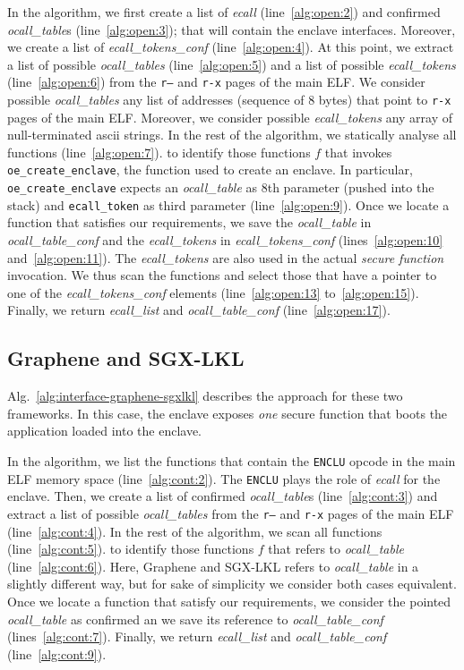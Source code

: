 In the algorithm, we first create a list of \emph{ecall}
(line~\ref{alg:open:2}) and confirmed \emph{ocall\_table}s
(line~\ref{alg:open:3}); that will contain the enclave interfaces.
Moreover, we create a list of \emph{ecall\_tokens\_conf}
(line~\ref{alg:open:4}).
At this point, we extract a list of possible \emph{ocall\_tables}
(line~\ref{alg:open:5}) and a list of possible \emph{ecall\_tokens}
(line~\ref{alg:open:6}) from the \texttt{r--} and \texttt{r-x} pages of the
main ELF.
We consider possible \emph{ocall\_tables} any list of addresses (\ie sequence
of $8$ bytes) that point to \texttt{r-x} pages of the main ELF.
Moreover, we consider possible \emph{ecall\_tokens} any array of
null-terminated ascii strings.
In the rest of the algorithm, we statically analyse all functions
(line~\ref{alg:open:7}).
to identify those functions $f$ that invokes
\texttt{oe\_create\_enclave}, the function used to create an enclave.
In particular, \texttt{oe\_create\_enclave} expects an \emph{ocall\_table} as
8th parameter (pushed into the stack) and \texttt{ecall\_token} as third
parameter (line~\ref{alg:open:9}).
Once we locate a function that satisfies our requirements, we save the
\emph{ocall\_table} in \emph{ocall\_table\_conf} and the \emph{ecall\_tokens}
in \emph{ecall\_tokens\_conf} (lines~\ref{alg:open:10} and~\ref{alg:open:11}).
The \emph{ecall\_tokens} are also used in the actual \emph{secure function}
invocation.
We thus scan the functions and select those that have a pointer to one of the
\emph{ecall\_tokens\_conf} elements (line~\ref{alg:open:13}
to~\ref{alg:open:15}).
Finally, we return \emph{ecall\_list} and \emph{ocall\_table\_conf}
(line~\ref{alg:open:17}).


\subsection{Graphene and SGX-LKL}
Alg.~\ref{alg:interface-graphene-sgxlkl} describes the approach for these two
frameworks.
In this case, the enclave exposes \emph{one} secure function that boots
the application loaded into the enclave.

In the algorithm, we list the functions that contain the \texttt{ENCLU} opcode
in the main ELF memory space (line~\ref{alg:cont:2}).
The \texttt{ENCLU} plays the role of \emph{ecall} for the enclave.
Then, we create a list of confirmed \emph{ocall\_table}s
(line~\ref{alg:cont:3}) and extract a list of possible \emph{ocall\_tables}
from the \texttt{r--} and \texttt{r-x} pages of the main ELF
(line~\ref{alg:cont:4}).
In the rest of the algorithm, we scan all functions (line~\ref{alg:cont:5}).
to identify those functions $f$ that refers to \emph{ocall\_table}
(line~\ref{alg:cont:6}).
Here, Graphene and SGX-LKL refers to \emph{ocall\_table} in a slightly
different way, but for sake of simplicity we consider both cases equivalent.
Once we locate a function that satisfy our requirements, we consider the pointed
\emph{ocall\_table} as confirmed an we save its reference to
\emph{ocall\_table\_conf} (lines~\ref{alg:cont:7}).
Finally, we return \emph{ecall\_list} and \emph{ocall\_table\_conf}
(line~\ref{alg:cont:9}).


